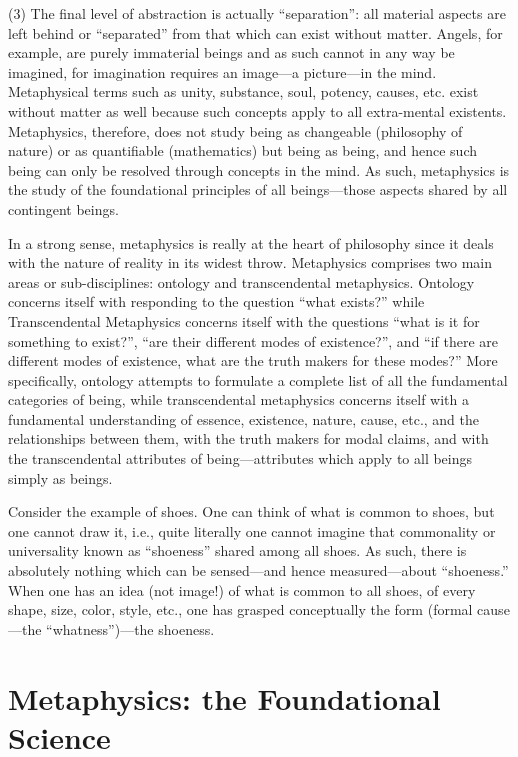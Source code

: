 (3) The final level of abstraction is actually “separation”: all material aspects are left behind or “separated” from that which can exist without matter. Angels, for example, are purely immaterial beings and as such cannot in any way be imagined, for imagination requires an image—a picture—in the mind. Metaphysical terms such as unity, substance, soul, potency, causes, etc. exist without matter as well because such concepts apply to all extra-mental existents. Metaphysics, therefore, does not study being as changeable (philosophy of nature) or as quantifiable (mathematics) but being as being, and hence such being can only be resolved through concepts in the mind. As such, metaphysics is the study of the foundational principles of all beings—those aspects shared by all contingent beings.

In a strong sense, metaphysics is really at the heart of philosophy since it deals with the nature of reality in its widest throw. Metaphysics comprises two main areas or sub-disciplines: ontology and transcendental metaphysics. Ontology concerns itself with responding to the question “what exists?” while Transcendental Metaphysics concerns itself with the questions “what is it for something to exist?”, “are their different modes of existence?”, and “if there are different modes of existence, what are the truth makers for these modes?” More specifically, ontology attempts to formulate a complete list of all the fundamental categories of being, while transcendental metaphysics concerns itself with a fundamental understanding of essence, existence, nature, cause, etc., and the relationships between them, with the truth makers for modal claims, and with the transcendental attributes of being—attributes which apply to all beings simply as beings.

Consider the example of shoes. One can think of what is common to shoes, but one cannot draw it, i.e., quite literally one cannot imagine that commonality or universality known as “shoeness” shared among all shoes. As such, there is absolutely nothing which can be sensed—and hence measured—about “shoeness.” When one has an idea (not image!) of what is common to all shoes, of every shape, size, color, style, etc., one has grasped conceptually the form (formal cause—the “whatness”)—the shoeness.

\section{Metaphysics: the Foundational Science}

